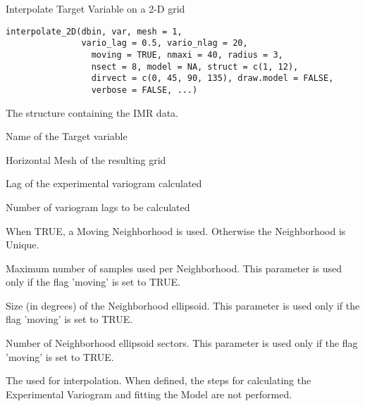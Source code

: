 %
\begin{Description}\relax
Interpolate Target Variable on a 2-D grid
\end{Description}
%
\begin{Usage}
\begin{verbatim}
interpolate_2D(dbin, var, mesh = 1,
               vario_lag = 0.5, vario_nlag = 20,
 	             moving = TRUE, nmaxi = 40, radius = 3,
	             nsect = 8, model = NA, struct = c(1, 12),
	             dirvect = c(0, 45, 90, 135), draw.model = FALSE,
	             verbose = FALSE, ...)
\end{verbatim}
\end{Usage}
%
\begin{Arguments}
\begin{ldescription}
\item[\code{dbin}] 
The  structure containing the IMR data.

\item[\code{var}] 
Name of the Target variable

\item[\code{mesh}] 
Horizontal Mesh of the resulting grid

\item[\code{vario\_lag}] 
Lag of the experimental variogram calculated

\item[\code{vario\_nlag}] 
Number of variogram lags to be calculated

\item[\code{moving}] 
When TRUE, a Moving Neighborhood is used. Otherwise the Neighborhood is
Unique.

\item[\code{nmaxi}] 
Maximum number of samples used per Neighborhood. This parameter is
used only if the flag 'moving' is set to TRUE.

\item[\code{radius}] 
Size (in degrees) of the Neighborhood ellipsoid. This parameter is
used only if the flag 'moving' is set to TRUE.

\item[\code{nsect}] 
Number of Neighborhood ellipsoid sectors. This parameter is
used only if the flag 'moving' is set to TRUE.

\item[\code{model}] 
The  used for interpolation. When defined,
the steps for calculating the Experimental Variogram and fitting the Model
are not performed.


\end{ldescription}
\end{Arguments}
